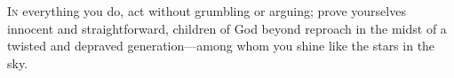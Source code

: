 
\lettrine{I}{n} everything you do, act without grumbling or arguing; prove yourselves innocent and straightforward, children of God beyond reproach in the midst of a twisted and depraved generation—among whom you shine like the stars in the sky.